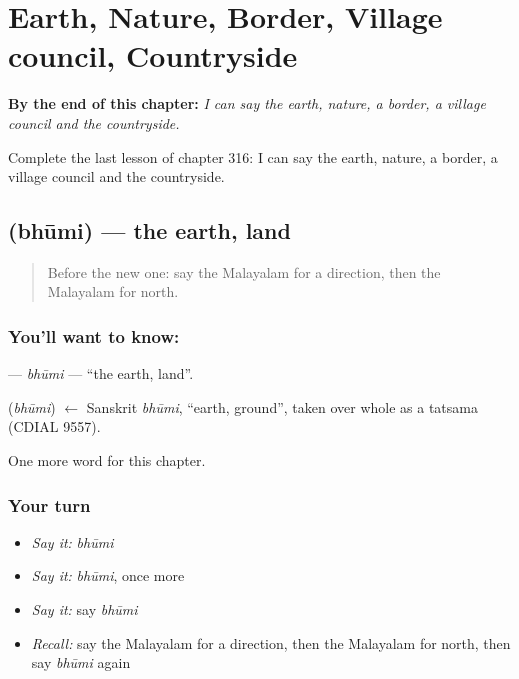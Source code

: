 
\chapter{Earth, Nature, Border, Village council, Countryside}
\label{ch:ml-earth-nature-border-village-council-countryside}

\begin{chapteropening}
\textbf{By the end of this chapter:} \emph{I can say the earth, nature, a border, a village council and the countryside.}

Complete the last lesson of chapter 316: I can say the earth, nature, a border, a village council and the countryside.
\end{chapteropening}

\section[\texorpdfstring{\ml{ഭൂമി} (bhūmi)}{ഭൂമി (bhūmi)}]{ (bhūmi) — the earth, land}

\label{lesson:ML-C316-bhumi}



\begin{quote}
Before the new one: say the Malayalam for a direction, then the Malayalam for north.
\end{quote}

\subsection*{You'll want to know: }
\textbf{} — \emph{bhūmi} — \textquotedblleft{}the earth, land\textquotedblright{}.

\begin{cousinweb}
\textbf{} (\emph{bhūmi}) $\leftarrow$ Sanskrit \emph{bhūmi}, \textquotedblleft{}earth, ground\textquotedblright{}, taken over whole as a tatsama (CDIAL 9557).
\end{cousinweb}

\begin{grammarlens}[title={What you've built}]
One more word for this chapter.
\end{grammarlens}

\subsection*{Your turn}
\begin{itemize}
\raggedright
  \item \emph{Say it:} \emph{bhūmi}
  \item \emph{Say it:} \emph{bhūmi}, once more
  \item \emph{Say it:} say \emph{bhūmi}
  \item \emph{Recall:} say the Malayalam for a direction, then the Malayalam for north, then say \emph{bhūmi} again
\end{itemize}

